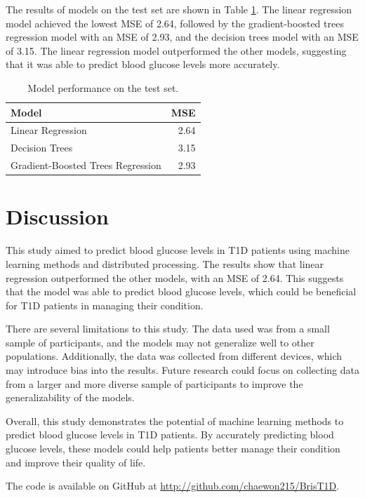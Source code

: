 \documentclass[
	a4paper, %
	10pt, %
	unnumberedsections, %
	twoside, %
]{LTJournalArticle}
\begin{document}
The results of models on the test set are shown in Table \ref{tab:distcounts}. The linear regression model achieved the lowest MSE of 2.64, followed by the gradient-boosted trees regression model with an MSE of 2.93, and the decision trees model with an MSE of 3.15. The linear regression model outperformed the other models, suggesting that it was able to predict blood glucose levels more accurately.

\begin{table}[h!]
	\caption{Model performance on the test set.}
	\centering
	\begin{tabular}{l r}
		\toprule
		Model & MSE \\
		\midrule
		Linear Regression & 2.64 \\
		Decision Trees & 3.15 \\
		Gradient-Boosted Trees Regression & 2.93 \\
		\bottomrule
	\end{tabular}
	\label{tab:distcounts}
\end{table}


\section{Discussion}

This study aimed to predict blood glucose levels in T1D patients using machine learning methods and distributed processing. The results show that linear regression outperformed the other models, with an MSE of 2.64. This suggests that the model was able to predict blood glucose levels, which could be beneficial for T1D patients in managing their condition.

There are several limitations to this study. The data used was from a small sample of participants, and the models may not generalize well to other populations. Additionally, the data was collected from different devices, which may introduce bias into the results. Future research could focus on collecting data from a larger and more diverse sample of participants to improve the generalizability of the models.

Overall, this study demonstrates the potential of machine learning methods to predict blood glucose levels in T1D patients. By accurately predicting blood glucose levels, these models could help patients better manage their condition and improve their quality of life.

The code is available on GitHub at \url{http://github.com/chaewon215/BrisT1D}.


\end{document}
